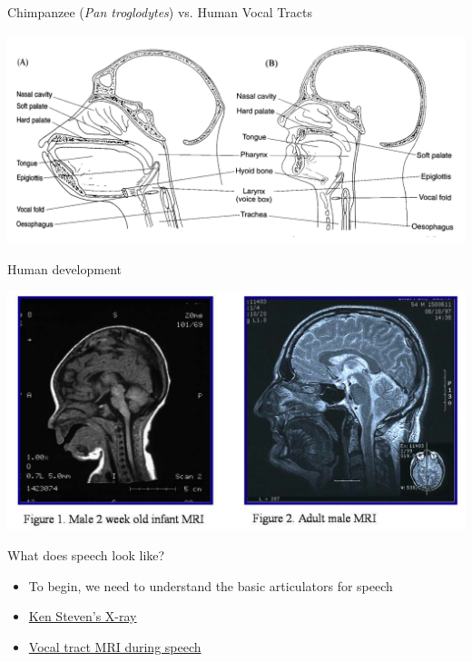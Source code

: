 \documentclass[professionalfonts]{beamer}
\begin{document}
\begin{frame}{Chimpanzee (\textit{Pan troglodytes}) vs. Human Vocal Tracts}
    \begin{center}
        \includegraphics[width = \textwidth]{figs/ChimpanzeeVSHumanVT.png}
    \end{center}
\end{frame}

\begin{frame}{Human development}
    \begin{center}
        \includegraphics[width = \textwidth]{figs/HumanChildAdultMRI.png}
    \end{center}
\end{frame}

\begin{frame}{What does speech look like?}
    \begin{itemize}
        \item To begin, we need to understand the basic articulators for speech
        \item \href{https://youtu.be/DcNMCB-Gsn8?feature=shared}{Ken Steven's X-ray}
        \item \href{https://youtu.be/Wrbe5fH888k?feature=shared}{Vocal tract MRI during speech}
    \end{itemize}
\end{frame}
\end{document}
